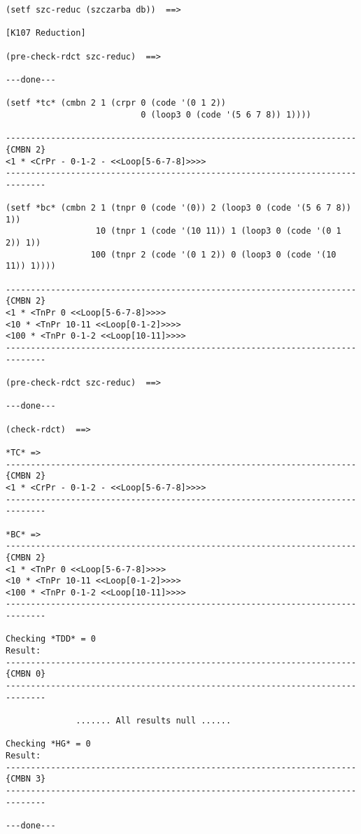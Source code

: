 {\footnotesize\begin{verbatim}
(setf szc-reduc (szczarba db))  ==>

[K107 Reduction]

(pre-check-rdct szc-reduc)  ==>

---done---

(setf *tc* (cmbn 2 1 (crpr 0 (code '(0 1 2)) 
                           0 (loop3 0 (code '(5 6 7 8)) 1))))

----------------------------------------------------------------------{CMBN 2}
<1 * <CrPr - 0-1-2 - <<Loop[5-6-7-8]>>>>
------------------------------------------------------------------------------

(setf *bc* (cmbn 2 1 (tnpr 0 (code '(0)) 2 (loop3 0 (code '(5 6 7 8)) 1))
                  10 (tnpr 1 (code '(10 11)) 1 (loop3 0 (code '(0 1 2)) 1))
                 100 (tnpr 2 (code '(0 1 2)) 0 (loop3 0 (code '(10 11)) 1))))

----------------------------------------------------------------------{CMBN 2}
<1 * <TnPr 0 <<Loop[5-6-7-8]>>>>
<10 * <TnPr 10-11 <<Loop[0-1-2]>>>>
<100 * <TnPr 0-1-2 <<Loop[10-11]>>>>
------------------------------------------------------------------------------

(pre-check-rdct szc-reduc)  ==>

---done---

(check-rdct)  ==>

*TC* => 
----------------------------------------------------------------------{CMBN 2}
<1 * <CrPr - 0-1-2 - <<Loop[5-6-7-8]>>>>
------------------------------------------------------------------------------

*BC* => 
----------------------------------------------------------------------{CMBN 2}
<1 * <TnPr 0 <<Loop[5-6-7-8]>>>>
<10 * <TnPr 10-11 <<Loop[0-1-2]>>>>
<100 * <TnPr 0-1-2 <<Loop[10-11]>>>>
------------------------------------------------------------------------------

Checking *TDD* = 0
Result: 
----------------------------------------------------------------------{CMBN 0}
------------------------------------------------------------------------------
 
              ....... All results null ......

Checking *HG* = 0
Result: 
----------------------------------------------------------------------{CMBN 3}
------------------------------------------------------------------------------

---done---
\end{verbatim}}

